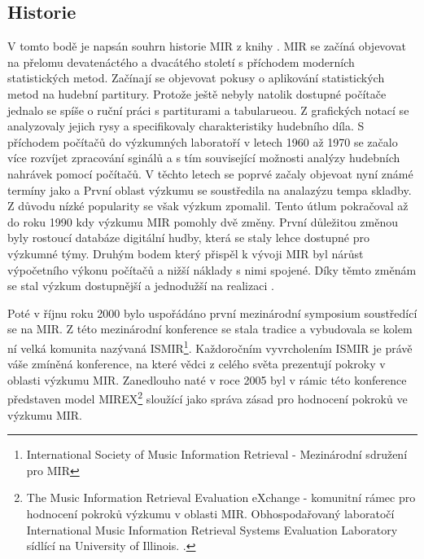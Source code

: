     \subsection{Historie}
    V tomto bodě je napsán souhrn historie MIR z knihy \cite{a_new_companion_to_digital_humanities}.
    \acs*{MIR} se začíná objevovat na přelomu devatenáctého a dvacátého století s příchodem moderních statistických metod.
    Začínají se objevovat pokusy o aplikování statistických metod na hudební partitury.
    Protože ještě nebyly natolik dostupné počítače jednalo se spíše o ruční práci s partiturami a tabularueou.
    Z grafických notací se analyzovaly jejich rysy a specifikovaly charakteristiky hudebního díla.
    S příchodem počítačů do výzkumných laboratoří v letech 1960 až 1970 se začalo více rozvíjet zpracování sginálů a s tím související možnosti analýzy hudebních nahrávek pomocí počítačů.
    V těchto letech se poprvé začaly objevoat nyní známé termíny jako  a 
    První oblast výzkumu se soustředila na analazýzu tempa skladby. Z důvodu nízké popularity se však výzkum zpomalil.
    Tento útlum pokračoval až do roku 1990 kdy výzkumu \acs*{MIR} pomohly dvě změny.
    První důležitou změnou byly rostoucí databáze digitální hudby, která se staly lehce dostupné pro výzkumné týmy.
    Druhým bodem který přispěl k vývoji \acs{MIR} byl nárůst výpočetního výkonu počítačů a nižší náklady s nimi spojené.
    Díky těmto změnám se stal výzkum dostupnější a jednodužší na realizaci \cite{a_new_companion_to_digital_humanities}.

    Poté v říjnu roku 2000 bylo uspořádáno první mezinárodní symposium soustředící se na \acs{MIR}.
    Z této mezinárodní konference se stala tradice a vybudovala se kolem ní velká komunita nazývaná \acs{ISMIR}\footnote{International Society of Music Information Retrieval - Mezinárodní sdružení pro \acs*{MIR}}.
    Každoročním vyvrcholením \acs{ISMIR} je právě váše zmíněná konference, na které vědci z celého světa prezentují pokroky v oblasti výzkumu \acs{MIR}.
    Zanedlouho naté v roce 2005 byl v rámic této konference představen model \acs{MIREX}\footnote{The Music Information Retrieval Evaluation eXchange - komunitní rámec pro hodnocení pokroků výzkumu v oblasti \acs{MIR}.
    Obhospodařovaný laboratočí International Music Information Retrieval Systems Evaluation Laboratory sídlící na University of Illinois.  \cite{Downie2010}.}
    sloužící jako správa zásad pro hodnocení pokroků ve výzkumu \acs{MIR}\cite{Downie2010}.
    
